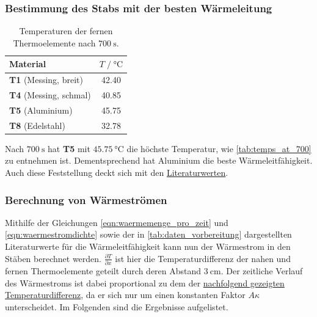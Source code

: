 \subsubsection{Bestimmung des Stabs mit der besten Wärmeleitung}


\begin{table}[H]
  \centering
  \caption{Temperaturen der fernen Thermoelemente nach $\SI{700}{\second}$.}
  \label{tab:temps_at_700}
  \begin{tabular}{l c}
  \toprule
  Material &
  $T \;/\; \si{\celsius}$ \\
  \midrule
  \textbf{T1} (Messing, breit)  & \num{42.40} \\
  \textbf{T4} (Messing, schmal) & \num{40.85} \\
  \textbf{T5} (Aluminium)       & \num{45.75} \\
  \textbf{T8} (Edelstahl)       & \num{32.78} \\
  \bottomrule
  \end{tabular}
\end{table}

Nach $\SI{700}{\second}$ hat \textbf{T5} mit $\SI{45.75}{\celsius}$ die höchste Temperatur,
wie \autoref{tab:temps_at_700} zu entnehmen ist.
Dementsprechend hat Aluminium die beste Wärmeleitfähigkeit.
Auch diese Feststellung deckt sich mit den \hyperref[tab:daten_vorbereitung]{Literaturwerten}.


\subsubsection{Berechnung von Wärmeströmen}

Mithilfe der Gleichungen \eqref{eqn:waermemenge_pro_zeit} und \eqref{eqn:waermestromdichte}
sowie der in \autoref{tab:daten_vorbereitung} dargestellten Literaturwerte für die Wärmeleitfähigkeit
kann nun der Wärmestrom in den Stäben berechnet werden.
$\frac{\partial T}{\partial x}$ ist hier die Temperaturdifferenz der nahen und fernen Thermoelemente geteilt durch deren Abstand $\SI{3}{\centi\meter}$.
Der zeitliche Verlauf des Wärmestroms ist dabei proportional zu dem der \hyperref[fig:statisch_tdiff]{nachfolgend gezeigten Temperaturdifferenz},
da er sich nur um einen konstanten Faktor $A \kappa$ unterscheidet.
Im Folgenden sind die Ergebnisse aufgelistet.

